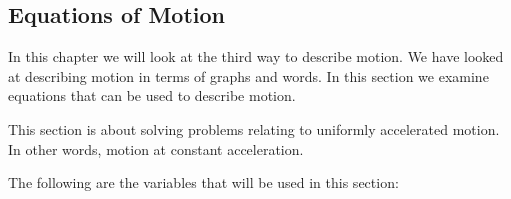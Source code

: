     
    
    
    
    
  
    \label{m38796*cid10}
            \subsection{ Equations of Motion}
            \nopagebreak
            
      
      \label{m38796*id75595}In this chapter we will look at the third way to describe motion. We have looked at describing motion in terms of graphs and words. In this section we examine equations that can be used to describe motion.\par 
      \label{m38796*id75600}This section is about solving problems relating to uniformly accelerated motion. In other words, motion at constant acceleration.\par 
      \label{m38796*id75605}The following are the variables that will be used in this section:\par 
      \label{m38796*id75611}\nopagebreak\noindent{}
